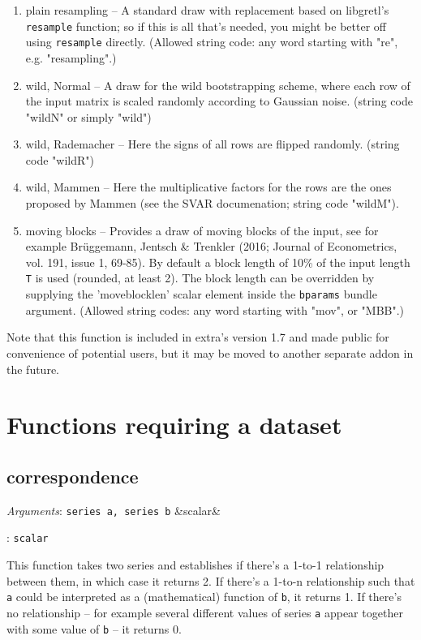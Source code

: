\documentclass[11pt,english]{article}
\newcommand{\ArgRet}[2]{%
  {\it Arguments}: {#1}%
  \ifx&#2&%
  \else
  \par\smallskip\noindent {\it Return type}: \texttt{#2}
  \fi%
  \par\medskip\par%
  }
\begin{document}
\begin{enumerate}
  \item plain resampling -- A standard draw with replacement based on
    libgretl's \texttt{resample} function; so if this is all that's needed, you
    might be better off using \texttt{resample} directly. (Allowed string code:
    any word starting with "re", e.g. "resampling".)

  \item wild, Normal -- A draw for the wild bootstrapping scheme, where each
    row of the input matrix is scaled randomly according to Gaussian noise.
    (string code "wildN" or simply "wild")
  \item wild, Rademacher -- Here the signs of all rows are flipped randomly. 
    (string code "wildR") 
  \item wild, Mammen -- Here the multiplicative factors for the rows are the
    ones proposed by Mammen (see the SVAR documenation; string code "wildM").
  \item moving blocks -- Provides a draw of moving blocks of the input, see 
    for example Brüggemann, Jentsch \& Trenkler (2016; Journal of Econometrics,
    vol. 191, issue 1, 69-85). By default a block length of 10\% of the input 
    length \texttt{T} is used (rounded, at least 2). The block length can be
    overridden by supplying the 'moveblocklen' scalar element inside the
    \texttt{bparams} bundle argument. (Allowed string codes: any word starting
    with "mov", or "MBB".)

\end{enumerate}

Note that this function is included in extra's version 1.7 and made public for
convenience of potential users, but it may be moved to another separate addon
in the future. 



\section{Functions requiring a dataset}

\subsection{correspondence}

\ArgRet{\texttt{series a, series b}}{scalar}

This function takes two series and establishes if there's a 1-to-1
relationship between them, in which case it returns 2.  If there's a
1-to-n relationship such that \texttt{a} could be interpreted as a
(mathematical) function of \texttt{b}, it returns 1. If there's no relationship
-- for example several different values of series \texttt{a} appear together
with some value of \texttt{b} -- it returns 0.
\end{document}
